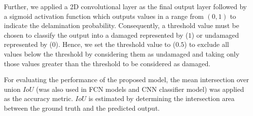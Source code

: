 Further, we applied a 2D convolutional layer as the final output layer followed by a sigmoid activation function which outputs values in a range from \((0,1)\) to indicate the delamination probability.
Consequently, a threshold value must be chosen to classify the output into a damaged represented by (\(1\)) or undamaged represented by (\(0\)).
Hence, we set the threshold value to (\(0.5\)) to exclude all values below the threshold by considering them as undamaged and taking only those values greater than the threshold to be considered as damaged.

For evaluating the performance of the proposed model, the mean 
intersection over union \(IoU\) (was also used in FCN models and CNN classifier model) was applied as the accuracy metric. 
\(IoU\) is estimated by determining the intersection
area between the ground truth and the predicted output. 
